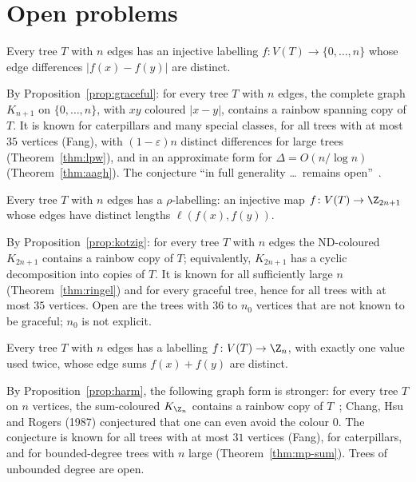 \section{Open problems}\label{sec:open}

\begin{conjecture}\label{conj:graceful-open}
Every tree $T$ with $n$ edges has an injective labelling $f\colon V(T)\to\{0,\dots,n\}$ whose edge differences $|f(x)-f(y)|$ are distinct.
\end{conjecture}

By Proposition~\ref{prop:graceful}: for every tree $T$ with $n$ edges, the complete graph $K_{n+1}$ on $\{0,\dots,n\}$, with $xy$ coloured $|x-y|$, contains a rainbow spanning copy of $T$. It is known for caterpillars and many special classes, for all trees with at most $35$ vertices (Fang), with $(1-\varepsilon)n$ distinct differences for large trees (Theorem~\ref{thm:lpw}), and in an approximate form for $\Delta=O(n/\log n)$ (Theorem~\ref{thm:aagh}). The conjecture ``in full generality \dots\ remains open''~\cite[\S1]{lpw25}.

\begin{conjecture}\label{conj:kotzig-open}
Every tree $T$ with $n$ edges has a $\rho$-labelling: an injective map $f\colon V(T)\to\Z_{2n+1}$ whose edges have distinct lengths $\ell(f(x),f(y))$.
\end{conjecture}

By Proposition~\ref{prop:kotzig}: for every tree $T$ with $n$ edges the ND-coloured $K_{2n+1}$ contains a rainbow copy of $T$; equivalently, $K_{2n+1}$ has a cyclic decomposition into copies of $T$. It is known for all sufficiently large $n$ (Theorem~\ref{thm:ringel}) and for every graceful tree, hence for all trees with at most $35$ vertices. Open are the trees with $36$ to $n_0$ vertices that are not known to be graceful; $n_0$ is not explicit.

\begin{conjecture}\label{conj:gs-open}
Every tree $T$ with $n$ edges has a labelling $f\colon V(T)\to\Z_n$, with exactly one value used twice, whose edge sums $f(x)+f(y)$ are distinct.
\end{conjecture}

By Proposition~\ref{prop:harm}, the following graph form is stronger: for every tree $T$ on $n$ vertices, the sum-coloured $K_{\Z_n}$ contains a rainbow copy of $T$~\cite[Conjecture~1.3]{mp25b}; Chang, Hsu and Rogers (1987) conjectured that one can even avoid the colour $0$. The conjecture is known for all trees with at most $31$ vertices (Fang), for caterpillars, and for bounded-degree trees with $n$ large (Theorem~\ref{thm:mp-sum}). Trees of unbounded degree are open.

